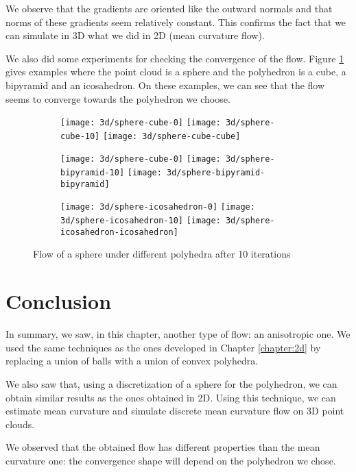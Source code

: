 We observe that the gradients are oriented like the outward normals and that
norms of these gradients seem relatively constant. This confirms the fact that
we can simulate in 3D what we did in 2D (mean curvature flow).

We also did some experiments for checking the convergence of the flow. Figure
\ref{fig:3d-flow-sphere} gives examples where the point cloud is a sphere and
the polyhedron is a cube, a bipyramid and an icosahedron. On these examples, we
can see that the flow seems to converge towards the polyhedron we choose.

\begin{figure}[h]
    \centering
    \begin{subfigure}[b]{\textwidth}
        \centering
        \texttt{[image: 3d/sphere-cube-0]}
        \texttt{[image: 3d/sphere-cube-10]}
        \texttt{[image: 3d/sphere-cube-cube]}
    \end{subfigure}

    \begin{subfigure}[b]{\textwidth}
        \centering
        \texttt{[image: 3d/sphere-cube-0]}
        \texttt{[image: 3d/sphere-bipyramid-10]}
        \texttt{[image: 3d/sphere-bipyramid-bipyramid]}
    \end{subfigure}

    \begin{subfigure}[b]{\textwidth}
        \centering
        \texttt{[image: 3d/sphere-icosahedron-0]}
        \texttt{[image: 3d/sphere-icosahedron-10]}
        \texttt{[image: 3d/sphere-icosahedron-icosahedron]}
    \end{subfigure}

    \caption{Flow of a sphere under different polyhedra after 10 iterations}
    \label{fig:3d-flow-sphere}
\end{figure}

\section{Conclusion}

In summary, we saw, in this chapter, another type of flow: an anisotropic one.
We used the same techniques as the ones developed in Chapter \ref{chapter:2d} by
replacing a union of balls with a union of convex polyhedra.

We also saw that, using a discretization of a sphere for the polyhedron, we can
obtain similar results as the ones obtained in 2D. Using this technique, we can
estimate mean curvature and simulate discrete mean curvature flow on 3D point
clouds.

We observed that the obtained flow has different properties than the mean
curvature one: the convergence shape will depend on the polyhedron we chose.

